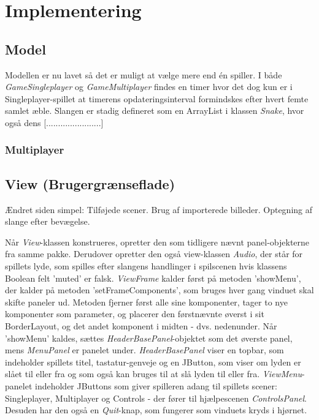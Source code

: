 
\section{Implementering}
\subsection{Model}
Modellen er nu lavet så det er muligt at vælge mere end én spiller. I både \textit{GameSingleplayer} og \textit{GameMultiplayer} findes en timer hvor det dog kun er i Singleplayer-spillet at timerens opdateringsinterval formindskes efter hvert femte samlet æble. Slangen er stadig defineret som en ArrayList i klassen \textit{Snake}, hvor også dens [.......................]

\subsubsection{Multiplayer}

\subsection{View (Brugergrænseflade)}
Ændret siden simpel: Tilføjede scener. Brug af importerede billeder. Optegning af slange efter bevægelse.

Når \textit{View}-klassen konstrueres, opretter den som tidligere nævnt panel-objekterne fra samme pakke. Derudover opretter den også view-klassen \textit{Audio}, der står for spillets lyde, som spilles efter slangens handlinger i spilscenen hvis klassens Boolean felt 'muted' er falsk. \textit{ViewFrame} kalder først på metoden 'showMenu', der kalder på metoden 'setFrameComponents', som bruges hver gang vinduet skal skifte paneler ud. Metoden fjerner først alle sine komponenter, tager to nye komponenter som parameter, og placerer den førstnævnte øverst i sit BorderLayout, og det andet komponent i midten - dvs. nedenunder. Når 'showMenu' kaldes, sættes \textit{HeaderBasePanel}-objektet som det øverste panel, mens \textit{MenuPanel} er panelet under. \textit{HeaderBasePanel} viser en topbar, som indeholder spillets titel, tastatur-genveje og en JButton, som viser om lyden er slået til eller fra og som også kan bruges til at slå lyden til eller fra. \textit{ViewMenu}-panelet indeholder JButtons som giver spilleren adang til spillets scener: Singleplayer, Multiplayer og Controls - der fører til hjælpescenen \textit{ControlsPanel}. Desuden har den også en \textit{Quit}-knap, som fungerer som vinduets kryds i hjørnet. 

